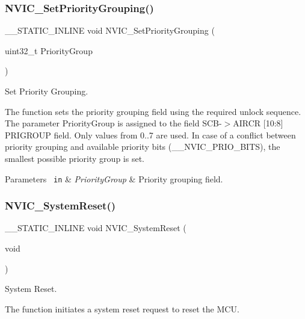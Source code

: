 \subsubsection{\texorpdfstring{NVIC\_SetPriorityGrouping()}{NVIC\_SetPriorityGrouping()}}
{\footnotesize\ttfamily \+\_\+\+\_\+\+S\+T\+A\+T\+I\+C\+\_\+\+I\+N\+L\+I\+NE void N\+V\+I\+C\+\_\+\+Set\+Priority\+Grouping (\begin{DoxyParamCaption}\item[{uint32\+\_\+t}]{Priority\+Group }\end{DoxyParamCaption})}



Set Priority Grouping. 

The function sets the priority grouping field using the required unlock sequence. The parameter Priority\+Group is assigned to the field S\+C\+B-\/$>$A\+I\+R\+CR \mbox{[}10\+:8\mbox{]} P\+R\+I\+G\+R\+O\+UP field. Only values from 0..7 are used. In case of a conflict between priority grouping and available priority bits (\+\_\+\+\_\+\+N\+V\+I\+C\+\_\+\+P\+R\+I\+O\+\_\+\+B\+I\+TS), the smallest possible priority group is set.


\begin{DoxyParams}[1]{Parameters}
\mbox{\texttt{ in}}  & {\em Priority\+Group} & Priority grouping field. \\
\hline
\end{DoxyParams}
\mbox{\label{group___c_m_s_i_s___core___n_v_i_c_functions_ga1143dec48d60a3d6f238c4798a87759c}} 
\subsubsection{\texorpdfstring{NVIC\_SystemReset()}{NVIC\_SystemReset()}}
{\footnotesize\ttfamily \+\_\+\+\_\+\+S\+T\+A\+T\+I\+C\+\_\+\+I\+N\+L\+I\+NE void N\+V\+I\+C\+\_\+\+System\+Reset (\begin{DoxyParamCaption}\item[{void}]{ }\end{DoxyParamCaption})}



System Reset. 

The function initiates a system reset request to reset the M\+CU. 